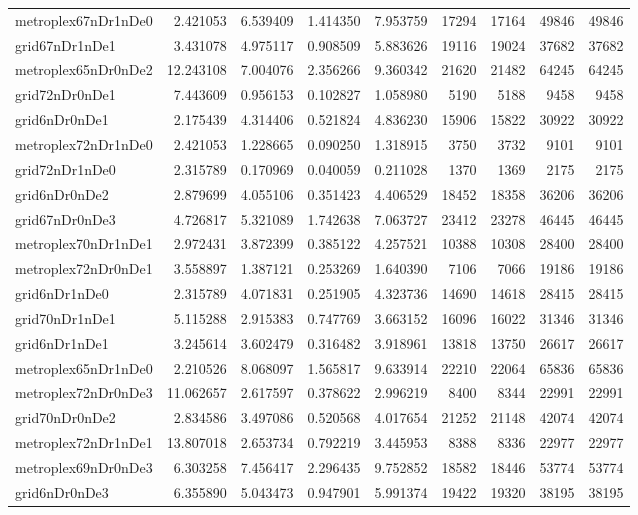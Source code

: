 \begin{longtable}{|l|r|r|r|r|r|r|r|r|}
metroplex67nDr1nDe0 & 2.421053 & 6.539409 & 1.414350 & 7.953759 & 17294 & 17164 & 49846 & 49846 \\
grid67nDr1nDe1 & 3.431078 & 4.975117 & 0.908509 & 5.883626 & 19116 & 19024 & 37682 & 37682 \\
metroplex65nDr0nDe2 & 12.243108 & 7.004076 & 2.356266 & 9.360342 & 21620 & 21482 & 64245 & 64245 \\
grid72nDr0nDe1 & 7.443609 & 0.956153 & 0.102827 & 1.058980 & 5190 & 5188 & 9458 & 9458 \\
grid6nDr0nDe1 & 2.175439 & 4.314406 & 0.521824 & 4.836230 & 15906 & 15822 & 30922 & 30922 \\
metroplex72nDr1nDe0 & 2.421053 & 1.228665 & 0.090250 & 1.318915 & 3750 & 3732 & 9101 & 9101 \\
grid72nDr1nDe0 & 2.315789 & 0.170969 & 0.040059 & 0.211028 & 1370 & 1369 & 2175 & 2175 \\
grid6nDr0nDe2 & 2.879699 & 4.055106 & 0.351423 & 4.406529 & 18452 & 18358 & 36206 & 36206 \\
grid67nDr0nDe3 & 4.726817 & 5.321089 & 1.742638 & 7.063727 & 23412 & 23278 & 46445 & 46445 \\
metroplex70nDr1nDe1 & 2.972431 & 3.872399 & 0.385122 & 4.257521 & 10388 & 10308 & 28400 & 28400 \\
metroplex72nDr0nDe1 & 3.558897 & 1.387121 & 0.253269 & 1.640390 & 7106 & 7066 & 19186 & 19186 \\
grid6nDr1nDe0 & 2.315789 & 4.071831 & 0.251905 & 4.323736 & 14690 & 14618 & 28415 & 28415 \\
grid70nDr1nDe1 & 5.115288 & 2.915383 & 0.747769 & 3.663152 & 16096 & 16022 & 31346 & 31346 \\
grid6nDr1nDe1 & 3.245614 & 3.602479 & 0.316482 & 3.918961 & 13818 & 13750 & 26617 & 26617 \\
metroplex65nDr1nDe0 & 2.210526 & 8.068097 & 1.565817 & 9.633914 & 22210 & 22064 & 65836 & 65836 \\
metroplex72nDr0nDe3 & 11.062657 & 2.617597 & 0.378622 & 2.996219 & 8400 & 8344 & 22991 & 22991 \\
grid70nDr0nDe2 & 2.834586 & 3.497086 & 0.520568 & 4.017654 & 21252 & 21148 & 42074 & 42074 \\
metroplex72nDr1nDe1 & 13.807018 & 2.653734 & 0.792219 & 3.445953 & 8388 & 8336 & 22977 & 22977 \\
metroplex69nDr0nDe3 & 6.303258 & 7.456417 & 2.296435 & 9.752852 & 18582 & 18446 & 53774 & 53774 \\
grid6nDr0nDe3 & 6.355890 & 5.043473 & 0.947901 & 5.991374 & 19422 & 19320 & 38195 & 38195 \\

\end{longtable}

